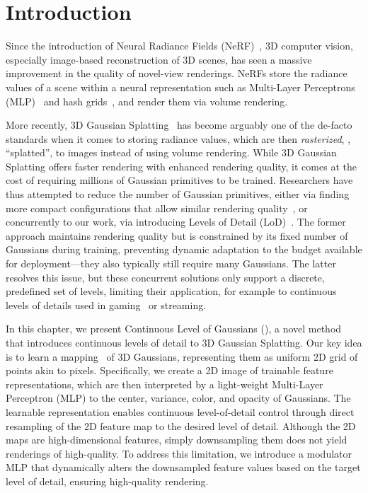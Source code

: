 \section{Introduction}
  \label{sec:clog-intro}
  Since the introduction of Neural Radiance Fields
  (NeRF)~\cite{mildenhall2020nerf}, 3D computer vision, especially image-based
  reconstruction of 3D scenes, has seen a massive improvement in the quality of
  novel-view renderings.
  NeRFs store the radiance values of a scene within a neural representation such
  as Multi-Layer Perceptrons (MLP)~\cite{mildenhall2020nerf} and hash
  grids~\cite{mueller2022instant}, and render them via volume rendering.

  More recently, 3D Gaussian Splatting~\cite{kerbl20233d} has become arguably
  one of the de-facto standards when it comes to storing radiance values, which
  are then \emph{rasterized}, \ie, ``splatted'', to images instead of using
  volume rendering.
  While 3D Gaussian Splatting offers faster rendering with enhanced rendering
  quality, it comes at the cost of requiring millions of Gaussian primitives to
  be trained.
  Researchers have thus attempted to reduce the number of Gaussian primitives,
  either via finding more compact configurations that allow similar rendering
  quality~\cite{fan2023lightgaussian,lee2024compact,niedermayr2024compressed,niemeyer2024radsplat},
  or concurrently to our work, via introducing Levels of Detail
  (LoD)~\cite{seo2024flod,shi2024lapisgs}.
  The former approach maintains rendering quality but is constrained by its
  fixed number of Gaussians during training, preventing dynamic adaptation to
  the budget available for deployment---they also typically still require many
  Gaussians.
  The latter resolves this issue, but these concurrent solutions only support a
  discrete, predefined set of levels, limiting their application, for example to
  continuous levels of details used in gaming~\cite{venter2022unreal} or
  streaming.

  In this chapter, we present Continuous Level of Gaussians (\clog), a novel
  method that introduces continuous levels of detail to 3D Gaussian Splatting.
  Our key idea is to learn a mapping~\cite{flavell2010uv} of 3D Gaussians,
  representing them as uniform 2D grid of points akin to pixels.
  Specifically, we create a 2D image of trainable feature representations, which
  are then interpreted by a light-weight Multi-Layer Perceptron (MLP) to the
  center, variance, color, and opacity of Gaussians.
  The learnable representation enables continuous level-of-detail control
  through direct resampling of the 2D feature map to the desired level of
  detail.
  Although the 2D maps are high-dimensional features, simply downsampling them
  does not yield renderings of high-quality.
  To address this limitation, we introduce a modulator MLP that dynamically
  alters the downsampled feature values based on the target level of detail,
  ensuring high-quality rendering.

